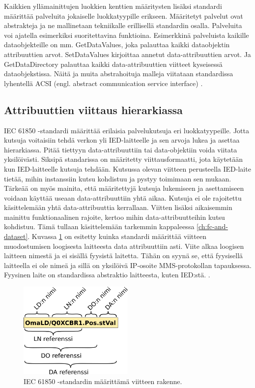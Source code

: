 Kaikkien yllämainittujen luokkien kenttien määritysten lisäksi standardi määrittää palveluita jokaiselle luokkatyypille erikseen. Määritetyt palvelut ovat abstrakteja ja ne mallinetaan tekniikalle erillisellä standardin osalla. Palveluita voi ajatella esimerkiksi suoritettavina funktioina. Esimerkkinä palveluista kaikille dataobjekteille on mm. GetDataValues, joka palauttaa kaikki dataobjektin attribuuttien arvot. SetDataValues kirjoittaa annetut data-attribuuttien arvot. Ja GetDataDirectory palauttaa kaikki data-attribuuttien viitteet kyseisessä dataobjekstissa. Näitä ja muita abstrahoituja malleja viitataan standardissa lyhentellä ACSI (engl. abstract communication service interface) \cite[s.~15,45--46]{IEC61850-7-2} \cite[s.~26]{IEC61850-7-1}.


\subsection{Attribuuttien viittaus hierarkiassa}
IEC 61850 -standardi määrittää erilaisia palvelukutsuja eri luokkatyypeille. Jotta kutsuja voitaisiin tehdä verkon yli IED-laitteelle ja sen arvoja lukea ja asettaa hierarkiassa. Pitää tiettyyn data-attribuuttiin tai data-objektiin voida viitata yksilöivästi. Siksipä standarissa on määritetty viittausformaatti, jota käytetään kun IED-laitteelle kutsuja tehdään. Kutsussa olevan viitteen perusteella IED-laite tietää, mihin instanssiin kutsu kohdistuu ja pystyy toimimaan sen mukaan. Tärkeää on myös mainita, että määritettyjä kutsuja lukemiseen ja asettamiseen voidaan käyttää useaan data-attribuuttiin yhtä aikaa. Kutsuja ei ole rajoitettu käsittelemään yhtä data-attribuuttia kerrallaan. Viitten lisäksi aikaisemmin mainittu funktionaalinen rajoite, kertoo mihin data-attribuutteihin kutsu kohdistuu. Tämä tullaan käsittelemään tarkemmin kappaleessa \ref{ch:fc-and-dataset}. Kuvassa \ref{fig:iec61850-data-reference} on esitetty kuinka standardi määrittää viitteen muodostumisen loogisesta laitteesta data attribuuttiin asti. Viite alkaa loogisen laitteen nimestä ja ei sisällä fyysistä laitetta. Tähän on syynä se, että fyysisellä laitteella ei ole nimeä ja sillä on yksilöivä IP-osoite MMS-protokollan tapauksessa. Fyysinen laite on standardissa abstraktio laitteesta, kuten IED:stä. \cite[s.~93]{IEC61850-7-1}.

\begin{figure}[ht!]
	\includegraphics[width=0.5\textwidth]{pictures/iec61850-data-reference.png}
	\caption{IEC 61850 -standardin määrittämä viitteen rakenne.}
	\label{fig:iec61850-data-reference}
\end{figure}

